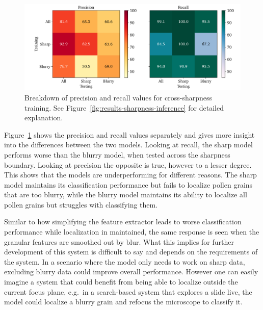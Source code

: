 \begin{figure}[htbp]
  \centering
  \includegraphics[width=\textwidth]{figs/results/sharpness/confustion_balanced_test_dual.pdf}
  \caption[Precision \& Recall across sharpness boundary]{%
Breakdown of precision and recall values for cross-sharpness training. See Figure~\ref{fig:results-sharpness-inference} for detailed explanation.
  }\label{fig:results-sharpness-pr-rec}
\end{figure}

Figure~\ref{fig:results-sharpness-pr-rec} shows the precision and recall values separately and gives more insight into the differences between the two models.
Looking at recall, the sharp model performs worse than the blurry model, when tested across the sharpness boundary.
Looking at precision the opposite is true, however to a lesser degree.
This shows that the models are underperforming for different reasons.
The sharp model maintains its classification performance but fails to localize pollen grains that are too blurry, while the blurry model maintains its ability to localize all pollen grains but struggles with classifying them.

Similar to how simplifying the feature extractor leads to worse classification performance while localization in maintained, the same response is seen when the granular features are smoothed out by blur.
What this implies for further development of this system is difficult to say and depends on the requirements of the system.
In a scenario where the model only needs to work on sharp data, excluding blurry data could improve overall performance.
However one can easily imagine a system that could benefit from being able to localize outside the current focus plane, e.g.\ in a search-based system that explores a slide live, the model could localize a blurry grain and refocus the microscope to classify it.

